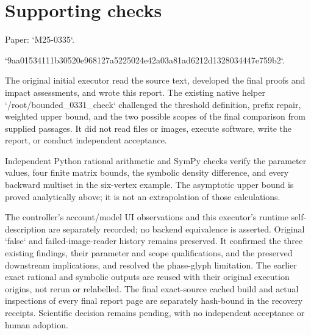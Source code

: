 \documentclass[10pt]{article}
\begin{document}
\section*{Supporting checks}
Paper: `M25-0335`.\par
`9aa01534111b30520e968127a5225024e42a03a81ad6212d1328034447e759b2`.\par
The original initial executor read the source text, developed the final proofs and impact assessments, and wrote this report. The existing native helper `/root/bounded\_0331\_check` challenged the threshold definition, prefix repair, weighted upper bound, and the two possible scopes of the final comparison from supplied passages. It did not read files or images, execute software, write the report, or conduct independent acceptance.\par
Independent Python rational arithmetic and SymPy checks verify the parameter values, four finite matrix bounds, the symbolic density difference, and every backward multiset in the six-vertex example. The asymptotic upper bound is proved analytically above; it is not an extrapolation of those calculations.\par
The controller’s account/model UI observations and this executor’s runtime self-description are separately recorded; no backend equivalence is asserted. Original `false` and failed-image-reader history remains preserved. It confirmed the three existing findings, their parameter and scope qualifications, and the preserved downstream implications, and resolved the phase-glyph limitation. The earlier exact rational and symbolic outputs are reused with their original execution origins, not rerun or relabelled. The final exact-source cached build and actual inspections of every final report page are separately hash-bound in the recovery receipts. Scientific decision remains pending, with no independent acceptance or human adoption.\par
\end{document}

